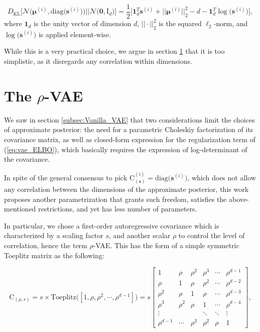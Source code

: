 \documentclass{article}
\begin{document}
\begin{equation}  \label{eq:vae_KLD_loss}
D_{\text{KL}}\Big[ \mathcal{N} \Big( \boldsymbol{\mu}^{(i)}, \text{diag} \big( \mathbf{s}^{(i)} \big) \Big)    \Big|\Big|  \mathcal{N} \big( \mathbf{0}, \mathrm{I}_d \big)  \Big] = \frac{1}{2} \Big[ \mathbf{1}_d^T \mathbf{s}^{(i)} + \big|\big| \boldsymbol{\mu}^{(i)} \big|\big|_2^2 -d -  \mathbf{1}_d^T \log \big({\mathbf{s}^{(i)}} \big) \Big], 
\end{equation}
where $\mathbf{1}_d$ is the unity vector of dimension $d$, $||\cdot||_2^2$ is the squared $\ell_2$-norm, and $\log \big({\mathbf{s}^{(i)}} \big)$ is applied element-wise.

While this is a very practical choice, we argue in section \ref{sec:proposed} that it is too simplistic, as it disregards any correlation within dimensions.
 
\section{The $\rho$-VAE}  \label{sec:proposed}
We saw in section \ref{subsec:Vanilla_VAE} that two considerations limit the choices of approximate posterior: the need for a parametric Choleskiy factorization of its covariance matrix, as well as closed-form expression for the regularization term of (\ref{eq:vae_ELBO}), which basically requires the expression of log-determinant  of the covariance.

In spite of the general consensus to pick $\mathrm{C}_{(\mathbf{s})}^{(i)} = \text{diag}\big( \mathbf{s}^{(i)} \big)$, which does not allow any correlation between the dimensions of the approximate posterior, this work proposes another parametrization that grants such freedom, satisfies the above-mentioned restrictions, and yet has less number of parameters.

In particular, we chose a first-order autoregressive covariance which is characterized by a scaling factor $s$, and another scalar $\rho$ to control the level of correlation, hence the term $\rho$-VAE. This has the form of a simple symmetric Toeplitz matrix as the following:

\begin{equation}  \label{eq:rho_cov}
\mathrm{C}_{(\rho,s)} = s \times  \text{Toeplitz} \Big([1,\rho, \rho^2, \cdots, \rho^{d-1}] \Big)
= s \begin{bmatrix}
    1          & \rho        & \rho^2     & \rho^3       & \cdots   & \rho^{d-1} \\
    \rho       & 1           & \rho       & \rho^2       & \cdots   & \rho^{d-2} \\
    \rho^2     & \rho        & 1          & \rho         & \cdots   & \rho^{d-3} \\
    \rho^3     & \rho^2      & \rho       & 1            & \cdots   & \rho^{d-4} \\
    \vdots     &       &       & \ddots       & \ddots   & \vdots      \\
    \rho^{d-1} & \cdots  & \rho^3 & \rho^2   & \rho   & 1
  \end{bmatrix},
\end{equation}
\end{document}
